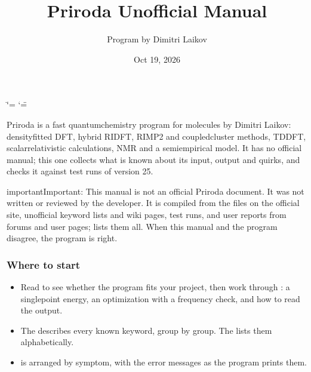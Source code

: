 \documentclass[letterpaper,10pt,english,openany,oneside]{sphinxmanual}
\title{Priroda Unofficial Manual}
\date{Oct 19, 2026}
\author{Program by Dimitri Laikov}
\begin{document}
\ifdefined\shorthandoff
  \ifnum\catcode`\=\string=\active\shorthandoff{=}\fi
  \ifnum\catcode`\"=\active{}\fi
\fi

\pagestyle{empty}
\sphinxmaketitle
\pagestyle{plain}
\renewcommand{\contentsname}{Contents}\sphinxtableofcontents
\pagestyle{normal}
\label{\detokenize{index::doc}}


\sphinxAtStartPar
Priroda is a fast quantum\sphinxhyphen{}chemistry program for molecules by Dimitri Laikov: density\sphinxhyphen{}fitted DFT, hybrid RI\sphinxhyphen{}DFT,
RI\sphinxhyphen{}MP2 and coupled\sphinxhyphen{}cluster methods, TDDFT, scalar\sphinxhyphen{}relativistic calculations, NMR and a semiempirical model. It has
no official manual; this one collects what is known about its input, output and quirks, and checks it against test
runs of version 25.

\begin{sphinxadmonition}{important}{Important:}
\sphinxAtStartPar
This manual is not an official Priroda document. It was not written or reviewed by the developer. It is compiled
from the files on the official site, unofficial keyword lists and wiki pages, test runs, and user reports from
forums and user pages; {\hyperref[\detokenize{sources:sources}]{}} lists them all. When this manual and the program disagree, the program is right.
\end{sphinxadmonition}
\subsubsection*{Where to start}
\begin{itemize}
\item {} 
\sphinxAtStartPar
{} Read {\hyperref[\detokenize{start/about::doc}]{}} to see whether the program fits your project, then work
through {\hyperref[\detokenize{start/getting-started::doc}]{}}: a single\sphinxhyphen{}point energy, an optimization with a frequency check, and how to
read the output.

\item {} 
\sphinxAtStartPar
{} The {\hyperref[\detokenize{reference/index::doc}]{}} describes every known keyword,
group by group. The  lists them alphabetically.

\item {} 
\sphinxAtStartPar
{} {\hyperref[\detokenize{troubleshooting/common-problems::doc}]{}} is arranged by symptom, with the error messages
as the program prints them.

\end{itemize}
\end{document}
